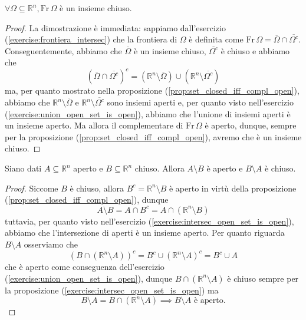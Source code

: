 \begin{lemma}
    $\forall \Omega \subseteq \mathbb{R}^n, \text{Fr} \, \Omega$ è un insieme chiuso.
    \label{lemma:frontiera_chiusa}
\end{lemma}
\begin{proof}
    La dimostrazione è immediata: sappiamo dall'esercizio (\ref{exercise:frontiera_intersec}) che la frontiera di $\Omega$ è definita come $\text{Fr} \, \Omega = \overline{\Omega} \cap \overline{\Omega^c}$. Conseguentemente,
    abbiamo che $\overline{\Omega}$ è un insieme chiuso, $\overline{\Omega^c}$ è chiuso e abbiamo che
    $$
        (\overline{\Omega} \cap \overline{\Omega^c})^c = (\mathbb{R}^n \setminus \overline{\Omega}) \cup (\mathbb{R}^n \setminus \overline{\Omega^c})
    $$
    ma, per quanto mostrato nella proposizione (\ref{prop:set_closed_iff_compl_open}), abbiamo che $\mathbb{R}^n \setminus \overline{\Omega}$ e $\mathbb{R}^n \setminus \overline{\Omega^c}$ sono insiemi aperti e, per quanto visto nell'esercizio (\ref{exercise:union_open_set_is_open}), abbiamo che
    l'unione di insiemi aperti è un insieme aperto. Ma allora il complementare di $\text{Fr} \, \Omega$ è aperto, dunque, sempre per la proposizione (\ref{prop:set_closed_iff_compl_open}), avremo che è un insieme chiuso.
\end{proof}
\begin{lemma}
    Siano dati $A \subseteq \mathbb{R}^n$ aperto e $B \subseteq \mathbb{R}^n$ chiuso. Allora $A \setminus B$ è aperto e $B \setminus A$ è chiuso.
    \label{lemma:diff_open_closed_set}
\end{lemma}
\begin{proof}
    Siccome $B$ è chiuso, allora $B^c = \mathbb{R}^n \setminus B$ è aperto in virtù della proposizione (\ref{prop:set_closed_iff_compl_open}), dunque 
    $$
    A \setminus B = A \cap B^c = A \cap (\mathbb{R}^n \setminus B)
    $$
    tuttavia, per quanto visto nell'esercizio (\ref{exercise:intersec_open_set_is_open}), abbiamo che l'intersezione di aperti è un insieme aperto. Per quanto riguarda $B \setminus A$ osserviamo che
    $$
    (B \cap (\mathbb{R}^n \setminus A))^c = B^c \cup (\mathbb{R}^n \setminus A)^c = B^c \cup A
    $$
    che è aperto come conseguenza dell'esercizio (\ref{exercise:union_open_set_is_open}), dunque $B \cap (\mathbb{R}^n \setminus A)$ è chiuso sempre per la proposizione (\ref{exercise:intersec_open_set_is_open}) ma
    $$
    B \setminus A = B \cap (\mathbb{R}^n \setminus A) \implies B \setminus A \text{ è aperto.}
    $$
\end{proof}
